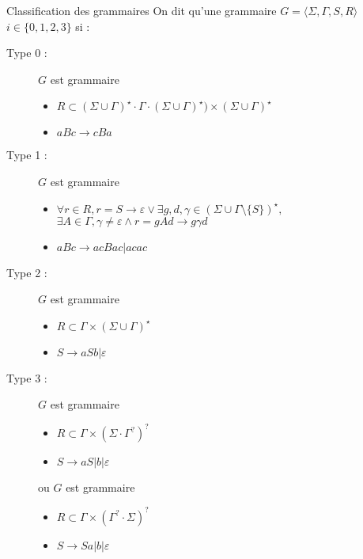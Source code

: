 
\begingroup

\begin{frame}{Classification des grammaires}
  On dit qu'une grammaire $G = \langle \Sigma, \Gamma, S, R \rangle$  $i \in \{0, 1, 2, 3\}$ si :
  \begin{description}
  \item[Type 0 :] $G$ est grammaire \\
    \begin{itemize}
    \item $R \subset (\Sigma\cup \Gamma)^\star \cdot \Gamma \cdot (\Sigma\cup \Gamma)^\star) \times (\Sigma \cup \Gamma)^\star$ 
    \item[\example{Exemple :}] $a B c \rightarrow c B a$
    \end{itemize}
  \item[Type 1 :] $G$ est grammaire \\
    \begin{itemize}
    \item $\forall r\in R, r =  S \rightarrow \varepsilon \lor \exists g, d, \gamma \in (\Sigma \cup \Gamma \setminus \{S\})^\star,$ \\ $\exists A\in \Gamma, \gamma\neq \varepsilon \land r = g A d \rightarrow g \gamma d$
    \item[\example{Exemple :}] $a B c \rightarrow ac B ac | acac$ 
    \end{itemize}
  \item[Type 2 :] $G$ est grammaire \\
    \begin{itemize}
    \item $R \subset \Gamma \times (\Sigma \cup \Gamma)^\star$ 
    \item[\example{Exemple :}] $S \rightarrow a S b | \varepsilon$ 
    \end{itemize}

  \item[Type 3 :] $G$ est grammaire 
    \begin{itemize}
    \item $R \subset \Gamma \times (\Sigma \cdot \Gamma^?)^?$ 
    \item[\example{Exemple :}] $S \rightarrow aS | b | \varepsilon$ 
    \end{itemize}

    ou $G$ est grammaire 
    \begin{itemize}
    \item $R \subset \Gamma \times (\Gamma^? \cdot \Sigma)^?$ 
    \item[\example{Exemple :}] $S \rightarrow Sa | b | \varepsilon$ 
    \end{itemize}
  \end{description}
\end{frame}

\endgroup
